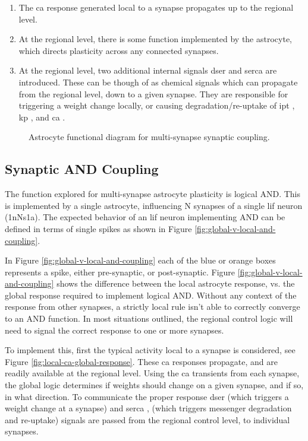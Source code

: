 \documentclass[conference]{IEEEtran}
\newcommand{\ca}{\gls{ca}\textrm{ }}
\newcommand{\ipt}{\gls{ipt}\textrm{ }}
\newcommand{\kp}{\gls{kp}\textrm{ }}
\newcommand{\dser}{\gls{dser}\textrm{ }}
\newcommand{\serca}{\gls{serca}\textrm{ }}
\newcommand{\asvgf}[4]{
	\begin{figure}[htbp]
    	\centering
		\adjustbox{max width=#4\linewidth}{}
        \caption{#2.}
        \label{#3}
	\end{figure}
}
\begin{document}
\begin{enumerate}
\item The \ca response generated local to a synapse propagates up to the
  regional level.
\item At the regional level, there is some function implemented by the
  astrocyte, which directs plasticity across any connected synapses.
\item At the regional level, two additional internal signals \dser and
  \serca are introduced. These can be though of as chemical signals which can
  propagate from the regional level, down to a given synapse. They are
  responsible for triggering a weight change locally, or causing
  degradation/re-uptake of \ipt, \kp, and \ca.
\end{enumerate}

\asvgf{figures/local-multi-compare.svg}{Astrocyte functional diagram for
  multi-synapse synaptic coupling}{fig:astro:syn_coupling}{1.0}

\subsection{Synaptic AND Coupling}
The function explored for multi-synapse astrocyte plasticity is logical
AND. This is implemented by a single astrocyte, influencing N synapses of a
single \gls{lif} neuron (1nNs1a). The expected behavior of an \gls{lif} neuron
implementing AND can be defined in terms of single spikes as shown in Figure
\ref{fig:global-v-local-and-coupling}.

In Figure \ref{fig:global-v-local-and-coupling} each of the blue or orange boxes
represents a spike, either pre-synaptic, or post-synaptic. Figure
\ref{fig:global-v-local-and-coupling} shows the difference between the local
astrocyte response, vs. the global response required to implement logical
AND. Without any context of the response from other synapses, a strictly local
rule isn't able to correctly converge to an AND function. In most situations
outlined, the regional control logic will need to signal the correct response to
one or more synapses.

To implement this, first the typical activity local to a synapse is considered,
see Figure \ref{fig:local-ca-global-response}. These \ca responses propagate,
and are readily available at the regional level. Using the \ca transients
from each synapse, the global logic determines if weights should change on a
given synapse, and if so, in what direction. To communicate the proper response
\dser (which triggers a weight change at a synapse) and \serca, (which triggers
messenger degradation and re-uptake) signals are passed from the regional
control level, to individual synapses.
\end{document}
